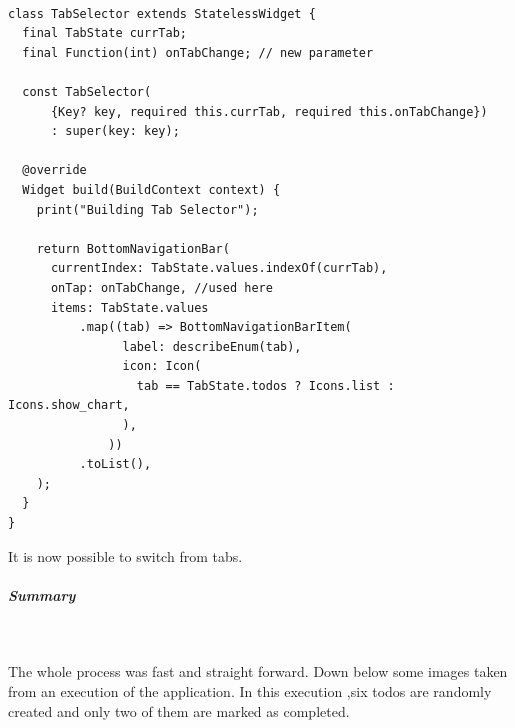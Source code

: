 \mbox{}\\


\begin{verbatim}
class TabSelector extends StatelessWidget {
  final TabState currTab;
  final Function(int) onTabChange; // new parameter

  const TabSelector(
      {Key? key, required this.currTab, required this.onTabChange})
      : super(key: key);

  @override
  Widget build(BuildContext context) {
    print("Building Tab Selector");

    return BottomNavigationBar(
      currentIndex: TabState.values.indexOf(currTab),
      onTap: onTabChange, //used here
      items: TabState.values
          .map((tab) => BottomNavigationBarItem(
                label: describeEnum(tab),
                icon: Icon(
                  tab == TabState.todos ? Icons.list : Icons.show_chart,
                ),
              ))
          .toList(),
    );
  }
}

\end{verbatim}

It is now possible to switch from tabs.


\subparagraph{Summary}\mbox{}\\
\label{subpar:todo_app_inherited_widget_summary}

The whole process was fast and straight forward. Down below some images taken from an execution of the application. In this execution ,six todos are randomly created and only two of them are marked as completed. 

